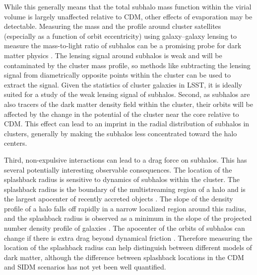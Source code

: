 While this generally means that the total subhalo mass function within the virial volume is largely unaffected relative to CDM, other effects of evaporation may be detectable. Measuring the mass and the profile around cluster satellites (especially as a function of orbit eccentricity) using galaxy--galaxy lensing to measure the mass-to-light ratio of subhalos can be a promising probe for dark matter physics \citep{Natarajan:2017sbo}. The lensing signal around subhalos is weak and will be contaminated by the cluster mass profile, so methods like subtracting the lensing signal from diametrically opposite points within the cluster can be used to extract the signal. Given the statistics of cluster galaxies in LSST, it is ideally suited for a study of the weak lensing signal of subhalos.  
Second, as subhalos are also tracers of the dark matter density field within the cluster, their orbits will be affected by the change in the potential of the cluster near the core relative to CDM.  This effect can lead to an imprint in the radial distribution of subhalos in clusters, generally by making the subhalos less concentrated toward the halo centers.

Third, non-expulsive interactions can lead to a drag force on subhalos.  This has several potentially interesting observable consequences.  The location of the splashback radius is sensitive to dynamics of subhalos within the cluster. The splashback radius is the boundary of the multistreaming region of a halo and is the largest apocenter of recently accreted objects \citep{Diemer:2014xya,Adhikari:2014lna}. The slope of the density profile of a halo falls off rapidly in a narrow localized region around this radius, and the splashback radius is observed as a minimum in the slope of the projected number density profile of galaxies \citep{More:2016vgs,Baxter:2017csy,Chang:2017hjt}.
The apocenter of the orbits of subhalos can change if there is extra drag beyond dynamical friction \citep{Kummer2018}.  
Therefore measuring the location of the splashback radius can help distinguish between different models of dark matter, although the difference between splashback locations in the CDM and SIDM scenarios has not yet been well quantified.

